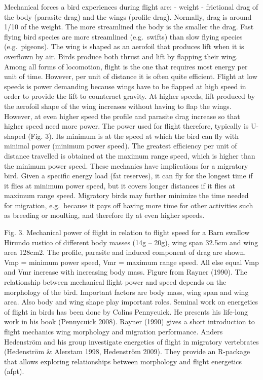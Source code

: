\documentclass[
]{book}
\begin{document}
Mechanical forces a bird experiences during flight are:
- weight
- frictional drag of the body (parasite drag) and the wings (profile drag).
Normally, drag is around 1/10 of the weight. The more streamlined the body is the smaller the drag. Fast flying bird species are more streamlined (e.g.~swifts) than slow flying species (e.g.~pigeons). The wing is shaped as an aerofoil that produces lift when it is overflown by air. Birds produce both thrust and lift by flapping their wing.
Among all forms of locomotion, flight is the one that requires most energy per unit of time. However, per unit of distance it is often quite efficient. Flight at low speeds is power demanding because wings have to be flapped at high speed in order to provide the lift to counteract gravity. At higher speeds, lift produced by the aerofoil shape of the wing increases without having to flap the wings. However, at even higher speed the profile and parasite drag increase so that higher speed need more power. The power used for flight therefore, typically is U-shaped (Fig. 3). Its minimum is at the speed at which the bird can fly with minimal power (minimum power speed). The greatest efficiency per unit of distance travelled is obtained at the maximum range speed, which is higher than the minimum power speed. These mechanics have implications for a migratory bird. Given a specific energy load (fat reserves), it can fly for the longest time if it flies at minimum power speed, but it covers longer distances if it flies at maximum range speed. Migratory birds may further minimize the time needed for migration, e.g.~because it pays off having more time for other activities such as breeding or moulting, and therefore fly at even higher speeds.

Fig. 3. Mechanical power of flight in relation to flight speed for a Barn swallow Hirundo rustico of different body masses (14g -- 20g), wing span 32.5cm and wing area 128cm2. The profile, parasite and induced component of drag are shown. Vmp = minimum power speed, Vmr = maximum range speed. All else equal Vmp and Vmr increase with increasing body mass. Figure from Rayner (1990).
The relationship between mechanical flight power and speed depends on the morphology of the bird. Important factors are body mass, wing span and wing area. Also body and wing shape play important roles.
Seminal work on energetics of flight in birds has been done by Colins Pennycuick. He presents his life-long work in his book (Pennycuick 2008). Rayner (1990) gives a short introduction to flight mechanics wing morphology and migration performance. Anders Hedenström and his group investigate energetics of flight in migratory vertebrates (Hedenström \& Alerstam 1998, Hedenström 2009). They provide an R-package that allows exploring relationships between morphology and flight energetics (afpt).
\end{document}
